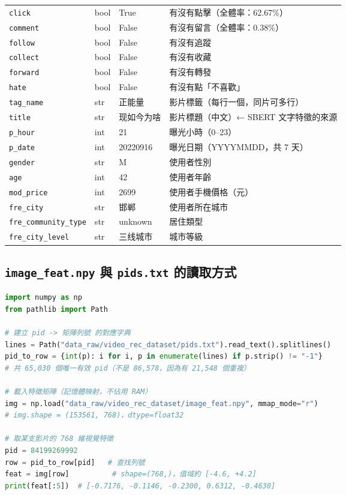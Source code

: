 \documentclass[12pt, a4paper]{article}
\begin{document}
\begin{table}[H]
\begin{tabular}{lll>{\raggedright\arraybackslash}p{5cm}}
\texttt{click}              & bool  & True          & 有沒有點擊（全體率：62.67\%） \\
\texttt{comment}            & bool  & False         & 有沒有留言（全體率：0.38\%） \\
\texttt{follow}             & bool  & False         & 有沒有追蹤 \\
\texttt{collect}            & bool  & False         & 有沒有收藏 \\
\texttt{forward}            & bool  & False         & 有沒有轉發 \\
\texttt{hate}               & bool  & False         & 有沒有點「不喜歡」 \\
\texttt{tag\_name}          & str   & 正能量        & 影片標籤（每行一個，同片可多行） \\
\texttt{title}              & str   & 现如今为啥    & 影片標題（中文）← SBERT 文字特徵的來源 \\
\texttt{p\_hour}            & int   & 21            & 曝光小時（0–23） \\
\texttt{p\_date}            & int   & 20220916      & 曝光日期（YYYYMMDD，共 7 天） \\
\texttt{gender}             & str   & M             & 使用者性別 \\
\texttt{age}                & int   & 42            & 使用者年齡 \\
\texttt{mod\_price}         & int   & 2699          & 使用者手機價格（元） \\
\texttt{fre\_city}          & str   & 邯郸          & 使用者所在城市 \\
\texttt{fre\_community\_type}& str  & unknown       & 居住類型 \\
\texttt{fre\_city\_level}   & str   & 三线城市      & 城市等級 \\
\bottomrule
\end{tabular}
\end{table}

\subsection{\texttt{image\_feat.npy} 與 \texttt{pids.txt} 的讀取方式}

\begin{lstlisting}[language=python, caption=讀取視覺特徵的正確方式]
import numpy as np
from pathlib import Path

# 建立 pid -> 矩陣列號 的對應字典
lines = Path("data_raw/video_rec_dataset/pids.txt").read_text().splitlines()
pid_to_row = {int(p): i for i, p in enumerate(lines) if p.strip() != "-1"}
# 共 65,030 個唯一有效 pid（不是 86,578，因為有 21,548 個重複）

# 載入特徵矩陣（記憶體映射，不佔用 RAM）
img = np.load("data_raw/video_rec_dataset/image_feat.npy", mmap_mode="r")
# img.shape = (153561, 768)，dtype=float32

# 取某支影片的 768 維視覺特徵
pid = 84199269992
row = pid_to_row[pid]   # 查找列號
feat = img[row]          # shape=(768,)，值域約 [-4.6, +4.2]
print(feat[:5])  # [-0.7176, -0.1146, -0.2300, 0.6312, -0.4630]
\end{lstlisting}
\end{document}

